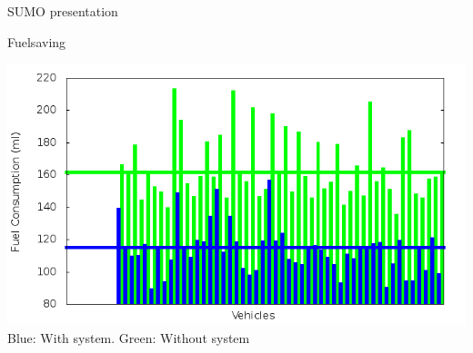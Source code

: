\begin{frame}{SUMO presentation}
\end{frame}

\begin{frame}{Fuelsaving}

	\includegraphics[width=1\textwidth]{images/tp0/fuelRoute.png}\\
	Blue: With system. Green: Without system

\end{frame}


